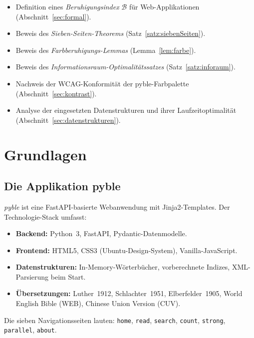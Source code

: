 ﻿\documentclass[a4paper,12pt]{article}
\theoremstyle{definition}
\begin{document}
\begin{itemize}
    \item Definition eines \emph{Beruhigungsindex} $\mathcal{B}$ für
          Web-Applikationen (Abschnitt~\ref{sec:formal}).
    \item Beweis des \emph{Sieben-Seiten-Theorems} (Satz~\ref{satz:siebenSeiten}).
    \item Beweis des \emph{Farbberuhigungs-Lemmas} (Lemma~\ref{lem:farbe}).
    \item Beweis des \emph{Informationsraum-Optimalitätssatzes}
          (Satz~\ref{satz:inforaum}).
    \item Nachweis der WCAG-Konformität der pyble-Farbpalette
          (Abschnitt~\ref{sec:kontrast}).
    \item Analyse der eingesetzten Datenstrukturen und ihrer Laufzeitoptimalität
          (Abschnitt~\ref{sec:datenstrukturen}).
\end{itemize}

\section{Grundlagen}

\subsection{Die Applikation pyble}

\textit{pyble} ist eine FastAPI-basierte Webanwendung mit Jinja2-Templates. Der
Technologie-Stack umfasst:

\begin{itemize}
    \item \textbf{Backend:} Python~3, FastAPI, Pydantic-Datenmodelle.
    \item \textbf{Frontend:} HTML5, CSS3 (Ubuntu-Design-System), Vanilla-JavaScript.
    \item \textbf{Datenstrukturen:} In-Memory-Wörterbücher, vorberechnete Indizes,
          XML-Parsierung beim Start.
    \item \textbf{Übersetzungen:} Luther~1912, Schlachter~1951, Elberfelder~1905,
          World English Bible (WEB), Chinese Union Version (CUV).
\end{itemize}

Die sieben Navigationsseiten lauten: \texttt{home}, \texttt{read}, \texttt{search},
\texttt{count}, \texttt{strong}, \texttt{parallel}, \texttt{about}.
\end{document}

